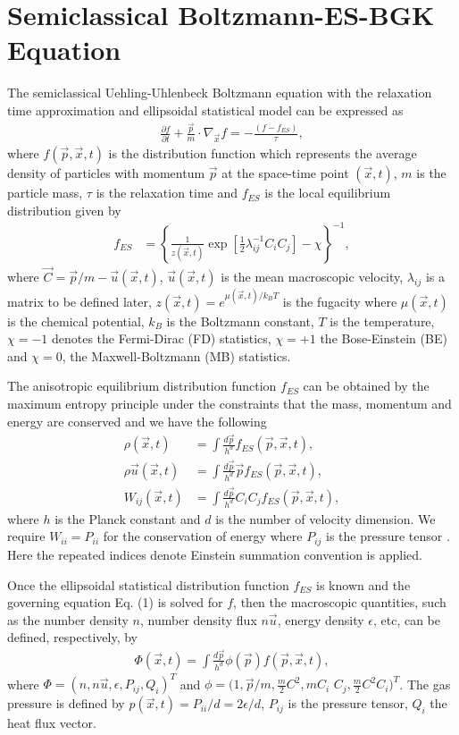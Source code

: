\documentclass[aip,jmp,amsmath,amssymb,reprint,noshowpacs]{revtex4-1}
\begin{document}
\section{Semiclassical Boltzmann-ES-BGK Equation}

The semiclassical Uehling-Uhlenbeck Boltzmann equation with the relaxation time approximation and ellipsoidal statistical model can be expressed as
\begin{align}
\frac{\partial f}{\partial t} + \frac{\vec p}{m} \cdot \nabla_{\vec x} f  =  -\frac{(f - f_{ES})}{\tau},
\end{align}
where  $f(\vec p, \vec x, t)$ is the distribution function which represents the average density of particles with momentum $\vec p$ at the space-time point $(\vec x, t)$, $m$ is the particle mass, $\tau$ is the relaxation time and $f_{ES}$ is the local equilibrium distribution given by
\begin{align}
f_{ES} &=\left\{ \frac{1}{z(\vec x,t)} \exp[ \frac{1}{2} \lambda_{i j}^{-1} C_{i} C_{j} ] - \chi \right\}^{-1},
\end{align}
where $\vec C=\vec p/m -\vec u(\vec x,t)$, $\vec u(\vec x,t)$ is the mean macroscopic velocity, $\lambda_{i j}$ is a matrix to be defined later, $z(\vec x, t)= e^{ \mu(\vec x, t) /k_B T }$ is the fugacity where $\mu(\vec x,t)$ is the chemical potential, $k_B$ is the Boltzmann constant, $T$ is the temperature, $\chi = -1$ denotes the Fermi-Dirac (FD) statistics, $\chi = +1$ the Bose-Einstein (BE) and $\chi = 0$, the Maxwell-Boltzmann (MB) statistics.

The anisotropic equilibrium distribution function $f_{ES}$ can be obtained by the maximum entropy principle under the constraints that the mass, momentum and energy are conserved and we have the following
\begin{align}
\rho(\vec x, t) &= \int \frac{d \vec p}{h^d}   f_{ES}(\vec p, \vec x, t), \\
\rho \vec u(\vec x, t) &= \int \frac{d \vec p}{h^d} \vec p  f_{ES}(\vec p, \vec x, t), \\
W_{i j}(\vec x, t) &= \int \frac{d \vec p}{h^d} C_{i} C_{j} f_{ES}(\vec p, \vec x, t),
\end{align}
where $h$ is the Planck constant and $d$ is the number of velocity dimension. We require $W_{i i}=P_{i i}$ for the conservation of energy where $P_{ij}$ is the pressure tensor \cite{Wu2012}.  Here the repeated indices denote Einstein summation convention is applied.

Once the ellipsoidal statistical distribution function $f_{ES}$ is known and the governing equation Eq. (1) is solved for $f$, then the macroscopic quantities, such as the number density $n$, number density flux $n\vec u$, energy density $\epsilon$, etc, can be defined, respectively, by
\begin{align}
\Phi (\vec x, t) = \int \frac{d \vec p }{ h^d} \phi(\vec p) f(\vec p, \vec x, t),
\end{align}
where $\Phi = (n, n\vec u, \epsilon, P_{ij}, Q_{i})^T$ and $\phi = (1, \vec p/m, \frac{m}{2} C^2, m C_{i} $ $C_{j}, \frac{m}{2}C^2 C_{i} )^T$.  The gas pressure is defined by $p(\vec x, t) = P_{i i}/d = 2 \epsilon /d$, $P_{ij}$ is the pressure tensor, $Q_{i}$ the heat flux vector.
\end{document}

